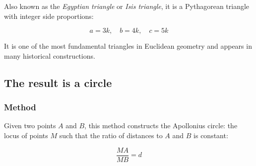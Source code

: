 \medskip
\noindent
Also known as the \emph{Egyptian triangle} or \emph{Isis triangle}, it is a Pythagorean triangle with integer side proportions:

\[
a = 3k,\quad b = 4k,\quad c = 5k
\]

\noindent
It is one of the most fundamental triangles in Euclidean geometry and appears in many historical constructions.

\vspace{1em}

\begin{minipage}{.5\textwidth}
\begin{center}
\end{center}
\end{minipage}
\begin{minipage}{.5\textwidth}
\begin{tkzexample}
\end{tkzexample}
\end{minipage}



\subsection{The result is a circle} %


\subsubsection{Method } %
\label{ssub:apollonius_circle_ma_mb_k}

Given two points $A$ and $B$, this method constructs the Apollonius circle: the locus of points $M$ such that the ratio of distances to $A$ and $B$ is constant:

\[
\dfrac{MA}{MB} = d
\]


